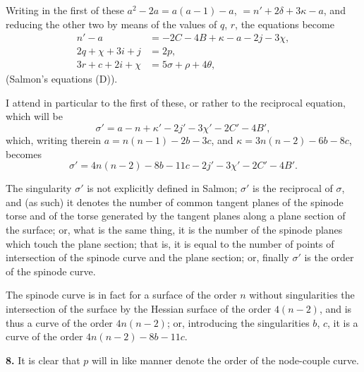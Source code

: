 \documentclass[11pt,a4paper]{article}
\begin{document}
Writing in the first of these $a^2 - 2a = a(a-1) - a$, $= n' + 2\delta + 3\kappa - a$, and reducing the other two by means of the values of $q$, $r$, the equations become
\begin{align*}
n' - a &= -2C - 4B + \kappa - a - 2j - 3\chi, \\
2q + \chi + 3i + j &= 2p, \\
3r + c + 2i + \chi &= 5\sigma + \rho + 4\theta,
\end{align*}
(Salmon's equations (D)).

I attend in particular to the first of these, or rather to the reciprocal equation, which will be
\[
\sigma' = a - n + \kappa' - 2j' - 3\chi' - 2C' - 4B',
\]
which, writing therein $a = n(n-1) - 2b - 3c$, and $\kappa = 3n(n-2) - 6b - 8c$, becomes
\[
\sigma' = 4n(n-2) - 8b - 11c - 2j' - 3\chi' - 2C' - 4B'.
\]

The singularity $\sigma'$ is not explicitly defined in Salmon; $\sigma'$ is the reciprocal of $\sigma$, and (as such) it denotes the number of common tangent planes of the spinode torse and of the torse generated by the tangent planes along a plane section of the surface; or, what is the same thing, it is the number of the spinode planes which touch the plane section; that is, it is equal to the number of points of intersection of the spinode curve and the plane section; or, finally $\sigma'$ is the order of the spinode curve.

The spinode curve is in fact for a surface of the order $n$ without singularities the intersection of the surface by the Hessian surface of the order $4(n-2)$, and is thus a curve of the order $4n(n-2)$; or, introducing the singularities $b$, $c$, it is a curve of the order $4n(n-2) - 8b - 11c$.

\textbf{8.} It is clear that $p$ will in like manner denote the order of the node-couple curve.
\end{document}

